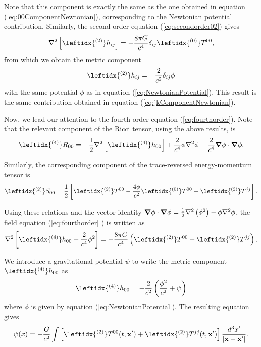 Note that this component is exactly the same as the one obtained in equation (\ref{eq:00ComponentNewtonian}), corresponding to the Newtonian potential contribution. Similarly, the second order equation (\ref{eq:secondorder02}) gives
\begin{equation}
\nabla^2 \left[ \leftidx{^{(2)}} h_{ij} \right] = - \frac{8\pi G}{c^4} \delta_{ij} \leftidx{^{(0)}}T^{00} ,
\end{equation}
from which we obtain the metric component
\begin{equation}
\leftidx{^{(2)}} h_{ij} = -\frac{2}{c^2} \delta_{ij} \phi
\end{equation}
with the same potential $\phi$ as in equation  (\ref{eq:NewtonianPotential}). This result is the same contribution obtained in equation (\ref{eq:jkComponentNewtonian}).
 
Now, we lead our attention to the fourth order equation (\ref{eq:fourthorder}). Note that the relevant component of the Ricci tensor, using the above results, is 
\begin{equation}
\leftidx{ ^{(4)}}R_{00} = - \frac{1}{2} \nabla^2 \left[ \leftidx{ ^{(4)}} h_{00} \right] + \frac{2}{c^4} \phi \nabla^2 \phi - \frac{2}{c^4} \bnabla \phi \cdot \bnabla \phi. 
\end{equation}

Similarly, the corresponding component of the trace-reversed energy-momentum tensor is
\begin{equation}
\leftidx{ ^{(2)}} S_{00}  = \frac{1}{2} \left[ \leftidx{ ^{(2)}} T^{00} - \frac{4\phi }{c^2} \leftidx{ ^{(0)}} T^{00} + \leftidx{ ^{(2)}} T^{jj} \right].
\end{equation}

Using these relations and the vector identity ${\boldsymbol{\nabla}} \phi \cdot {\boldsymbol{\nabla}} \phi = \frac{1}{2} \nabla^2 \left( \phi^2 \right) - \phi \nabla^2 \phi$, the field equation (\ref{eq:fourthorder} ) is written as
\begin{equation}
 \nabla^2 \left[ \leftidx{ ^{(4)}} h_{00} + \frac{2}{c^4} \phi^2  \right] = - \frac{8\pi G }{c^4}  \left( \leftidx{ ^{(2)}} T^{00}  + \leftidx{ ^{(2)}} T^{jj} \right) .
\end{equation}

We introduce a gravitational potential $\psi$ to write the metric component $\leftidx{ ^{(4)}} h_{00} $ as
\begin{equation}
\leftidx{ ^{(4)}} h_{00}  = -\frac{2}{c^2} \left(\frac{\phi^2}{c^2} + \psi \right)
\end{equation}
where $\phi$ is given by equation (\ref{eq:NewtonianPotential}). The resulting equation gives
\begin{equation}
\psi (x) = - \frac{G}{c^2}  \int  \left[ \leftidx{ ^{(2)}} T^{00}  (t, \textbf{x}')+ \leftidx{ ^{(2)}} T^{jj}  (t,  \textbf{x}') \right] \frac{d^3 x'}{\left| \textbf{x} - \textbf{x}'\right|}.
\end{equation}

